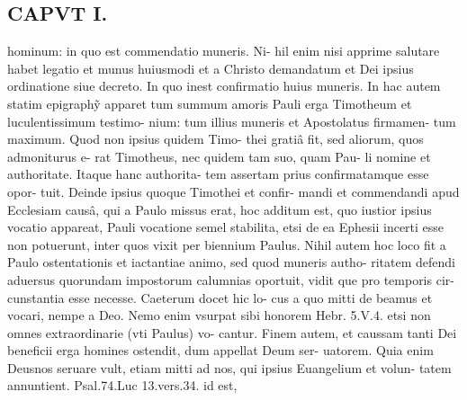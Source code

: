 \documentclass{article}
\begin{document}
\begin{pages}
\section*{CAPVT  I. }
\marginpar{[ p.3 ]}hominum: in quo est commendatio muneris. Ni- hil enim nisi apprime salutare habet legatio et munus huiusmodi et a Christo demandatum et Dei ipsius ordinatione siue decreto. In quo inest confirmatio huius muneris. In hac autem statim epigraphỹ apparet tum summum amoris Pauli erga Timotheum et luculentissimum testimo- nium: tum illius muneris et Apostolatus firmamen- tum maximum. Quod non ipsius quidem Timo- thei gratiâ fit, sed aliorum, quos admoniturus e- rat Timotheus, nec quidem tam suo, quam Pau- li nomine et authoritate. Itaque hanc authorita- tem assertam prius confirmatamque esse opor- tuit. Deinde ipsius quoque Timothei et confir- mandi et commendandi apud Ecclesiam causâ, qui a Paulo missus erat, hoc additum est, quo iustior ipsius vocatio appareat, Pauli vocatione semel stabilita, etsi de ea Ephesii incerti esse non potuerunt, inter quos vixit per biennium Paulus. Nihil autem hoc loco fit a Paulo ostentationis et iactantiae animo, sed quod muneris autho- ritatem defendi aduersus quorundam impostorum calumnias oportuit, vidit que pro temporis cir- cunstantia esse necesse. Caeterum docet hic lo- cus a quo mitti de beamus et vocari, nempe a Deo. Nemo enim vsurpat sibi honorem Hebr. 5.V.4. etsi non omnes extraordinarie (vti Paulus) vo- cantur. Finem autem, et caussam tanti Dei beneficii erga homines ostendit, dum appellat Deum ser- uatorem. Quia enim Deusnos seruare vult, etiam mitti ad nos, qui ipsius Euangelium et volun- tatem annuntient. Psal.74.Luc 13.vers.34. id est, 

\end{pages}
\end{document}
